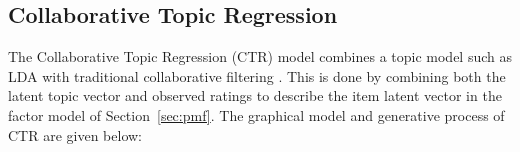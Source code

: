 \documentclass{article} %
\begin{document}
\subsection{Collaborative Topic Regression}

The Collaborative Topic Regression (CTR) model combines a topic model such as
LDA with traditional collaborative filtering \cite{ctr}. This is done by
combining both the latent topic vector and observed ratings to describe the
item latent vector in the factor model of Section~\ref{sec:pmf}. The graphical
model and generative process of CTR are given below:

\end{document}
